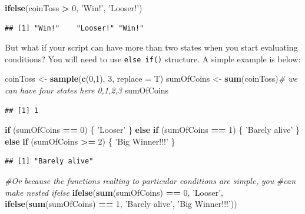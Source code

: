 \documentclass[]{book}
\newenvironment{Shaded}{\begin{snugshade}}{\end{snugshade}}
\newcommand{\KeywordTok}[1]{\textcolor[rgb]{0.13,0.29,0.53}{\textbf{#1}}}
\newcommand{\DataTypeTok}[1]{\textcolor[rgb]{0.13,0.29,0.53}{#1}}
\newcommand{\DecValTok}[1]{\textcolor[rgb]{0.00,0.00,0.81}{#1}}
\newcommand{\StringTok}[1]{\textcolor[rgb]{0.31,0.60,0.02}{#1}}
\newcommand{\CommentTok}[1]{\textcolor[rgb]{0.56,0.35,0.01}{\textit{#1}}}
\newcommand{\ControlFlowTok}[1]{\textcolor[rgb]{0.13,0.29,0.53}{\textbf{#1}}}
\newcommand{\OperatorTok}[1]{\textcolor[rgb]{0.81,0.36,0.00}{\textbf{#1}}}
\newcommand{\NormalTok}[1]{#1}
\theoremstyle{definition}
\theoremstyle{definition}
\theoremstyle{definition}
\theoremstyle{remark}
\begin{document}
\begin{Shaded}
\begin{Highlighting}[]
\KeywordTok{ifelse}\NormalTok{(coinToss }\OperatorTok{>}\StringTok{ }\DecValTok{0}\NormalTok{, }\StringTok{'Win!'}\NormalTok{, }\StringTok{'Looser!'}\NormalTok{)}
\end{Highlighting}
\end{Shaded}

\begin{verbatim}
## [1] "Win!"    "Looser!" "Win!"
\end{verbatim}

But what if your script can have more than two states when you start
evaluating conditions? You will need to use \texttt{else\ if()}
structure. A simple example is below:

\begin{Shaded}
\begin{Highlighting}[]
\NormalTok{coinToss <-}\StringTok{ }\KeywordTok{sample}\NormalTok{(}\KeywordTok{c}\NormalTok{(}\DecValTok{0}\NormalTok{,}\DecValTok{1}\NormalTok{), }\DecValTok{3}\NormalTok{, }\DataTypeTok{replace =}\NormalTok{ T)}
\NormalTok{sumOfCoins <-}\StringTok{ }\KeywordTok{sum}\NormalTok{(coinToss)}\CommentTok{# we can have four states here 0,1,2,3}
\NormalTok{sumOfCoins}
\end{Highlighting}
\end{Shaded}

\begin{verbatim}
## [1] 1
\end{verbatim}

\begin{Shaded}
\begin{Highlighting}[]
\ControlFlowTok{if}\NormalTok{ (sumOfCoins }\OperatorTok{==}\StringTok{ }\DecValTok{0}\NormalTok{) \{}
  \StringTok{'Looser'}
\NormalTok{\} }\ControlFlowTok{else} \ControlFlowTok{if}\NormalTok{ (sumOfCoins }\OperatorTok{==}\StringTok{ }\DecValTok{1}\NormalTok{) \{}
  \StringTok{'Barely alive'}
\NormalTok{\} }\ControlFlowTok{else} \ControlFlowTok{if}\NormalTok{ (sumOfCoins }\OperatorTok{>=}\StringTok{ }\DecValTok{2}\NormalTok{) \{}
  \StringTok{'Big Winner!!!'}
\NormalTok{\}}
\end{Highlighting}
\end{Shaded}

\begin{verbatim}
## [1] "Barely alive"
\end{verbatim}

\begin{Shaded}
\begin{Highlighting}[]
\CommentTok{#Or because the functions realting to particular conditions are simple, you}
\CommentTok{#can make nested ifelse}
\KeywordTok{ifelse}\NormalTok{(}\KeywordTok{sum}\NormalTok{(sumOfCoins) }\OperatorTok{==}\StringTok{ }\DecValTok{0}\NormalTok{, }\StringTok{'Looser'}\NormalTok{,}
       \KeywordTok{ifelse}\NormalTok{(}\KeywordTok{sum}\NormalTok{(sumOfCoins) }\OperatorTok{==}\StringTok{ }\DecValTok{1}\NormalTok{, }\StringTok{'Barely alive'}\NormalTok{, }\StringTok{'Big Winner!!!'}\NormalTok{))}
\end{Highlighting}
\end{Shaded}
\end{document}
